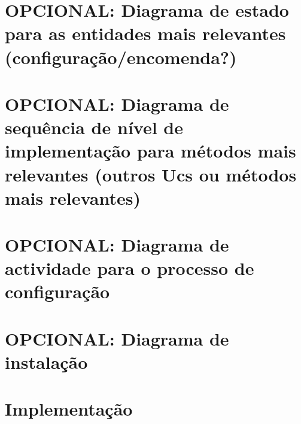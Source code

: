 \documentclass[11pt]{article} %
\begin{document}
\section{OPCIONAL: Diagrama de estado para as entidades mais relevantes
(configuração/encomenda?)}

\section{OPCIONAL: Diagrama de sequência de nível de implementação para métodos mais
relevantes (outros Ucs ou métodos mais relevantes)}

\section{OPCIONAL: Diagrama de actividade para o processo de configuração}

\section{OPCIONAL: Diagrama de instalação}

\section{Implementação}
\end{document}
